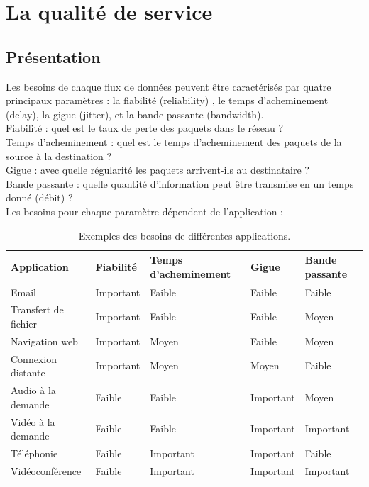 \chapter{La qualité de service}\label{ch:qos}

\section{Présentation}

Les besoins de chaque flux de données peuvent être caractérisés par quatre principaux paramètres : la fiabilité (reliability) , le temps d'acheminement (delay), la gigue (jitter), et la bande passante (bandwidth).\\
Fiabilité  : quel est le taux de perte des paquets dans le réseau ?\\
Temps d'acheminement : quel est le temps d'acheminement des paquets de la source à la destination ?\\
Gigue : avec quelle régularité les paquets arrivent-ils au destinataire ?\\
Bande passante : quelle quantité d'information peut être transmise en un temps donné (débit) ?\\
    
Les besoins pour chaque paramètre dépendent de l'application :
\begin{table}[!h]
  \centering
  \begin{tabular}{|l|l|l|l|l|} 
   \hline
    Application & Fiabilité & Temps d'acheminement & Gigue & Bande passante \\
    \hline
    Email & Important & Faible & Faible & Faible\\
    \hline
    Transfert de fichier & Important & Faible & Faible & Moyen\\
    \hline
    Navigation web & Important & Moyen & Faible & Moyen\\
    \hline
    Connexion distante & Important & Moyen & Moyen & Faible\\
    \hline
    Audio à la demande & Faible & Faible & Important & Moyen\\
    \hline
    Vidéo à la demande & Faible & Faible & Important & Important\\
    \hline
    Téléphonie & Faible & Important & Important & Faible\\
    \hline
    Vidéoconférence & Faible & Important & Important & Important\\
    \hline
  \end{tabular}
  \caption{Exemples des besoins de différentes applications. \cite{Tanenbaum2003}}
\end{table}

